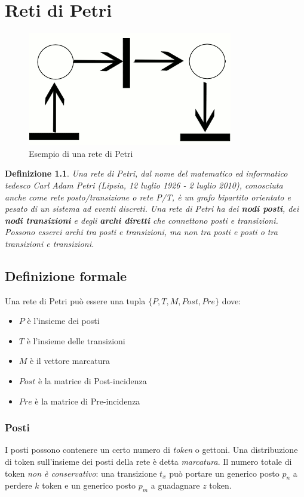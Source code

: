 \documentclass[a4paper]{report}
\newtheorem{definizione}{Definizione}
\newcommand{\bo}{\bfseries }
\begin{document}
\chapter{Reti di Petri}
\begin{figure}[!h]
  \begin{center}
    \includegraphics[scale=0.5]{./figures/petri.png}
    \caption{Esempio di una rete di Petri}\label{fig:petri01}
  \end{center}
\end{figure} 
\begin{definizione}
  Una rete di Petri, dal nome del matematico ed informatico tedesco Carl
  Adam Petri (Lipsia, 12 luglio 1926 - 2 luglio 2010), conosciuta anche
  come rete posto/transizione o rete P/T, \`e un grafo bipartito
  orientato e pesato di un sistema ad eventi discreti. Una rete di Petri
  ha dei {\bo nodi posti}, dei  {\bo nodi transizioni} e degli {\bo
    archi diretti} che connettono posti e transizioni. Possono esserci
  archi tra posti e transizioni, ma non tra posti e posti o tra
  transizioni e transizioni.
\end{definizione}
\section{Definizione formale}
Una rete di Petri pu\`o essere una tupla $\{ P, T, M, Post, Pre \}$ dove:
\begin{itemize}
\item $P$ \`e l'insieme dei posti
\item $T$ \`e l'insieme delle transizioni
\item $M$ \`e il vettore marcatura
\item $Post$ \`e la matrice di Post-incidenza 
\item $Pre$ \`e la matrice di Pre-incidenza 
\end{itemize}

\subsection{Posti}
I posti possono contenere un certo numero di {\em
  token} o gettoni. Una distribuzione di
token sull'insieme dei posti della rete \`e detta {\em
  marcatura}. 
Il numero totale di token
{\em non \`e conservativo}: una transizione $t_x$ pu\`o portare un generico
posto $p_n$ a perdere $k$ token e un generico posto $p_m$ a guadagnare
$z$ token.
\end{document}

